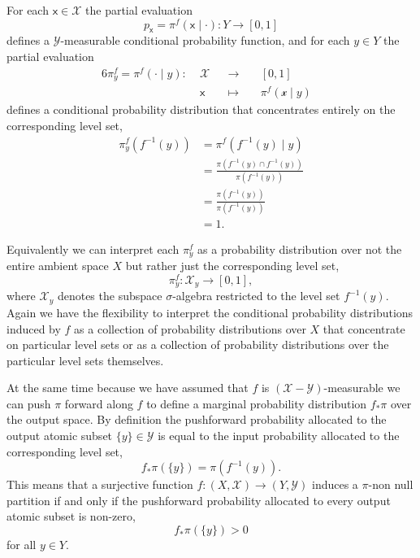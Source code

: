 \documentclass[
  letterpaper,
  DIV=11,
  numbers=noendperiod]{scrartcl}
\begin{document}
For each \(\mathsf{x} \in \mathcal{X}\) the partial evaluation \[
p_{\mathsf{x}} = \pi^{f} ( \mathsf{x} \mid \cdot )
: Y \rightarrow [0, 1]
\] defines a \(\mathcal{Y}\)-measurable conditional probability
function, and for each \(y \in Y\) the partial evaluation
\begin{alignat*}{6}
\pi^{f}_{y} = \pi^{f} ( \cdot \mid y )
:\; &\mathcal{X}& &\rightarrow& \; &[0, 1]&
\\
&\mathsf{x}& &\mapsto& &\pi^{f} ( \mathcal{x} \mid y )  &
\end{alignat*} defines a conditional probability distribution that
concentrates entirely on the corresponding level set, \begin{align*}
\pi^{f}_{y}( f^{-1}(y) )
&=
\pi^{f}( f^{-1}(y) \mid y )
\\
&=
\frac{ \pi(f^{-1}(y) \cap f^{-1}(y)) }{ \pi(f^{-1}(y)) }
\\
&=
\frac{ \pi(f^{-1}(y) ) }{ \pi(f^{-1}(y)) }
\\
&=
1.
\end{align*}

Equivalently we can interpret each \(\pi^{f}_{y}\) as a probability
distribution over not the entire ambient space \(X\) but rather just the
corresponding level set, \[
\pi^{f}_{y} : \mathcal{X}_{y} \rightarrow [0, 1],
\] where \(\mathcal{X}_{y}\) denotes the subspace \(\sigma\)-algebra
restricted to the level set \(f^{-1}(y)\). Again we have the flexibility
to interpret the conditional probability distributions induced by \(f\)
as a collection of probability distributions over \(X\) that concentrate
on particular level sets or as a collection of probability distributions
over the particular level sets themselves.

At the same time because we have assumed that \(f\) is
\((\mathcal{X}-\mathcal{Y})\)-measurable we can push \(\pi\) forward
along \(f\) to define a marginal probability distribution \(f_{*} \pi\)
over the output space. By definition the pushforward probability
allocated to the output atomic subset \(\{ y \} \in \mathcal{Y}\) is
equal to the input probability allocated to the corresponding level set,
\[
f_{*} \pi( \{ y \} ) = \pi ( f^{-1}(y) ).
\] This means that a surjective function
\(f : (X, \mathcal{X}) \rightarrow (Y, \mathcal{Y})\) induces a
\(\pi\)-non null partition if and only if the pushforward probability
allocated to every output atomic subset is non-zero, \[
f_{*} \pi( \{ y \} ) > 0
\] for all \(y \in Y\).
\end{document}
